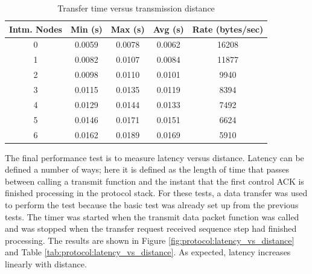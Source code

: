 \begin{table}
	\begin{center}
		\setlength{\extrarowheight}{1.5pt}
		\caption{Transfer time versus transmission distance}
		\vspace{0.1cm}
		\begin{tabular}{|c|c|c|c|c|}
			\hline
			\textbf{Intm. Nodes} & \textbf{Min (s)} & \textbf{Max (s)} & \textbf{Avg (s)} & \textbf{Rate (bytes/sec)} \\
			\hline
			\hline
			0 & 0.0059 & 0.0078 & 0.0062 & 16208 \\
			\hline
			1 & 0.0082 & 0.0107 & 0.0084 & 11877 \\
			\hline
			2 & 0.0098 & 0.0110 & 0.0101 & 9940 \\
			\hline
			3 & 0.0115 & 0.0135 & 0.0119 & 8394 \\
			\hline
			4 & 0.0129 & 0.0144 & 0.0133 & 7492 \\
			\hline
			5 & 0.0146 & 0.0171 & 0.0151 & 6624 \\
			\hline
			6 & 0.0162 & 0.0189 & 0.0169 & 5910 \\
			\hline
		\end{tabular}
		\label{tab:protocol:time_vs_distance}
	\end{center}
\end{table}

The final performance test is to measure latency versus distance. Latency can be defined a number of ways; here it is defined as the length of time that passes between calling a transmit function and the instant that the first control ACK is finished processing in the protocol stack. For these tests, a data transfer was used to perform the test because the basic test was already set up from the previous tests. The timer was started when the transmit data packet function was called and was stopped when the transfer request received sequence step had finished processing. The results are shown in Figure \ref{fig:protocol:latency_vs_distance} and Table \ref{tab:protocol:latency_vs_distance}. As expected, latency increases linearly with distance.

